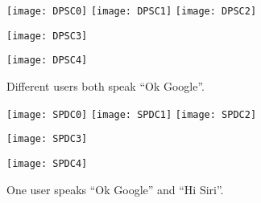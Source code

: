 \begin{figure}[h]
	\centering
	\begin{minipage}[t]{.8\linewidth}
		\centering
		\texttt{[image: DPSC0]}
		\vspace{-.2in}
		\vspace{.2in}
		\texttt{[image: DPSC1]}
		\texttt{[image: DPSC2]}
		\vspace{-.2in}
		\vspace{.2in}
	\end{minipage}
	\begin{minipage}[t]{.45\linewidth}
		\centering
		\texttt{[image: DPSC3]}
		\vspace{-.2in}
	\end{minipage}
	\begin{minipage}[t]{.45\linewidth}
		\centering
		\texttt{[image: DPSC4]}
		\vspace{-.2in}
	\end{minipage}
	\caption{Different users both speak ``Ok Google''.}
	\label{fig:DPSC}
\end{figure}
\begin{figure}[h]
	\centering
	\begin{minipage}[t]{.8\linewidth}
		\centering
		\texttt{[image: SPDC0]}
		\vspace{-.2in}
		\vspace{.2in}
		\texttt{[image: SPDC1]}
		\texttt{[image: SPDC2]}
		\vspace{-.2in}
		\vspace{.2in}
	\end{minipage}
	\begin{minipage}[t]{.45\linewidth}
		\centering
		\texttt{[image: SPDC3]}
		\vspace{-.2in}
	\end{minipage}
	\begin{minipage}[t]{.45\linewidth}
		\centering
		\texttt{[image: SPDC4]}
		\vspace{-.2in}
	\end{minipage}
	\caption{One user speaks ``Ok Google'' and ``Hi Siri''.}
	\label{fig:SPDC}
\end{figure}

